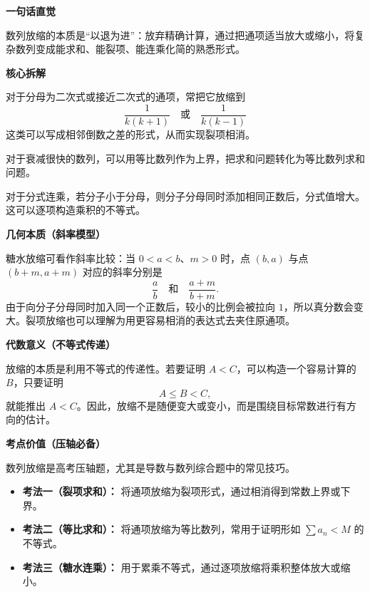 \begin{explanationbox}
	\textbf{\textcolor{CExplanation}{一句话直觉}}

	数列放缩的本质是“以退为进”：放弃精确计算，通过把通项适当放大或缩小，将复杂数列变成能求和、能裂项、能连乘化简的熟悉形式。

	\medskip
	\textbf{\textcolor{CExplanation}{核心拆解}}
	\begin{description}[style=nextline, leftmargin=2.8em, labelsep=0.5em, itemsep=0.45em]
		\item[\textbf{要点一（裂项思想）：}]
		      对于分母为二次式或接近二次式的通项，常把它放缩到
		      \[
			      \frac{1}{k(k+1)}\quad\text{或}\quad \frac{1}{k(k-1)}
		      \]
		      这类可以写成相邻倒数之差的形式，从而实现裂项相消。

		\item[\textbf{要点二（等比控制）：}]
		      对于衰减很快的数列，可以用等比数列作为上界，把求和问题转化为等比数列求和问题。

		\item[\textbf{要点三（糖水原理）：}]
		      对于分式连乘，若分子小于分母，则分子分母同时添加相同正数后，分式值增大。这可以逐项构造乘积的不等式。
	\end{description}

	\medskip
	\textbf{\textcolor{CExplanation}{几何本质（斜率模型）}}

	糖水放缩可看作斜率比较：当 $0<a<b$、$m>0$ 时，点 $(b,a)$ 与点 $(b+m,a+m)$ 对应的斜率分别是
	\[
		\frac{a}{b}\quad\text{和}\quad\frac{a+m}{b+m}.
	\]
	由于向分子分母同时加入同一个正数后，较小的比例会被拉向 $1$，所以真分数会变大。裂项放缩也可以理解为用更容易相消的表达式去夹住原通项。

	\medskip
	\textbf{\textcolor{CExplanation}{代数意义（不等式传递）}}

	放缩的本质是利用不等式的传递性。若要证明 $A<C$，可以构造一个容易计算的 $B$，只要证明
	\[
		A\le B<C,
	\]
	就能推出 $A<C$。因此，放缩不是随便变大或变小，而是围绕目标常数进行有方向的估计。

	\medskip
	\textbf{\textcolor{CExplanation}{考点价值（压轴必备）}}

	数列放缩是高考压轴题，尤其是导数与数列综合题中的常见技巧。
	\begin{itemize}[leftmargin=*, itemsep=0.5em, topsep=0.4em]
		\item \textbf{考法一（裂项求和）：} 将通项放缩为裂项形式，通过相消得到常数上界或下界。
		\item \textbf{考法二（等比求和）：} 将通项放缩为等比数列，常用于证明形如 $\sum a_n<M$ 的不等式。
		\item \textbf{考法三（糖水连乘）：} 用于累乘不等式，通过逐项放缩将乘积整体放大或缩小。
	\end{itemize}


\end{explanationbox}
